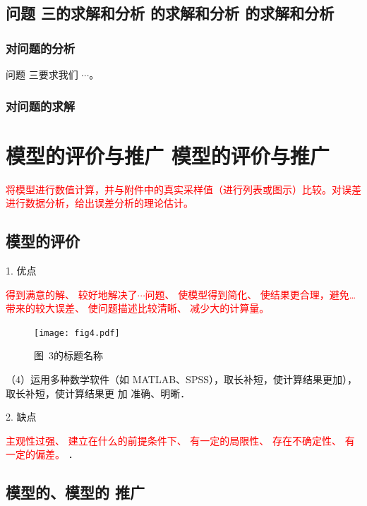 \documentclass[12pt,a4paper]{mcmthesis}
\begin{document}
    \subsection{问题 三的求解和分析 的求解和分析 的求解和分析}

    \subsubsection{对问题的分析}

    问题 三要求我们 $\cdots$。

    \subsubsection{对问题的求解}


    \section{模型的评价与推广 模型的评价与推广}

    \textcolor{red}{将模型进行数值计算，并与附件中的真实采样值（进行列表或图示）比较。对误差进行数据分析，给出误差分析的理论估计。}

    \subsection{模型的评价}


    1. 优点

    \textcolor{red}{得到满意的解、
    较好地解决了$\cdots$问题、
    使模型得到简化、
    使结果更合理，避免…带来的较大误差、
    使问题描述比较清晰、
    减少大的计算量。}



    \begin{figure}[h!t]
        \centerline{\texttt{[image: fig4.pdf]}}
        \caption{\song\wuhao 图~3的标题名称}
    \end{figure}


    （4）运用多种数学软件（如 MATLAB、SPSS），取长补短，使计算结果更加），取长补短，使计算结果更
    加 准确、明晰．

    2. 缺点

    \textcolor{red}{主观性过强、
    建立在什么的前提条件下、
    有一定的局限性、
    存在不确定性、
    有一定的偏差。
    }
    ．

    \subsection{模型的、模型的 推广}
\end{document}
